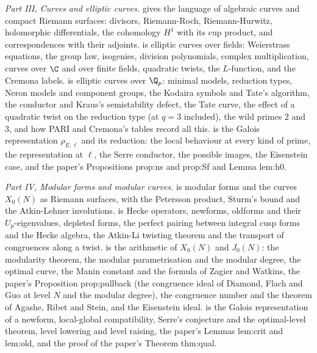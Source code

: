 \emph{Part III, Curves and elliptic curves.}  gives the language of algebraic
curves and compact Riemann surfaces: divisors, Riemann-Roch, Riemann-Hurwitz, holomorphic
differentials, the cohomology $H^1$ with its cup product, and correspondences with their adjoints.
 is elliptic curves over fields: Weierstrass equations, the group law,
isogenies, division polynomials, complex multiplication, curves over $\C$ and over finite fields,
quadratic twists, the $L$-function, and the Cremona labels.  is elliptic curves
over $\Q_p$: minimal models, reduction types, Neron models and component groups, the Kodaira
symbols and Tate's algorithm, the conductor and Kraus's semistability defect, the Tate curve, the
effect of a quadratic twist on the reduction type (at $q=3$ included), the wild primes $2$ and $3$,
and how PARI and Cremona's tables record all this.  is the Galois representation
$\rho_{E,\ell}$ and its reduction: the local behaviour at every kind of prime, the representation
at $\ell$, the Serre conductor, the possible images, the Eisenstein case, and the paper's
Propositions prop:ns and prop:Sf and Lemma lem:h0.

\emph{Part IV, Modular forms and modular curves.}  is modular forms and the
curves $X_0(N)$ as Riemann surfaces, with the Petersson product, Sturm's bound and the Atkin-Lehner
involutions.  is Hecke operators, newforms, oldforms and their $U_p$-eigenvalues,
depleted forms, the perfect pairing between integral cusp forms and the Hecke algebra, the
Atkin-Li twisting theorem and the transport of congruences along a twist.  is the
arithmetic of $X_0(N)$ and $J_0(N)$: the modularity theorem, the modular parametrisation and the
modular degree, the optimal curve, the Manin constant and the formula of Zagier and Watkins, the
paper's Proposition prop:pullback (the congruence ideal of Diamond, Flach and Guo at level $N$
and the modular degree), the
congruence number and the theorem of Agashe, Ribet and Stein, and the Eisenstein ideal.
 is the Galois representation of a newform, local-global compatibility, Serre's
conjecture and the optimal-level theorem, level lowering and level raising, the paper's Lemmas
lem:crit and lem:old, and the proof of the paper's Theorem thm:qual.

